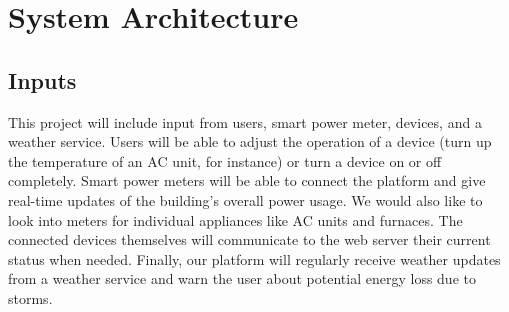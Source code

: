 \documentclass[12pt]{article} %
\begin{document}
\section{System Architecture}

\subsection{Inputs}
This project will include input from users, smart power meter, devices, and a weather service. Users will be able to adjust the operation of a device (turn up the temperature of an AC unit, for instance) or turn a device on or off completely. Smart power meters will be able to connect the platform and give real-time updates of the building's overall power usage. We would also like to look into meters for individual appliances like AC units and furnaces. The connected devices themselves will communicate to the web server their current status when needed. Finally, our platform will regularly receive weather updates from a weather service and warn the user about potential energy loss due to storms.
\end{document}
